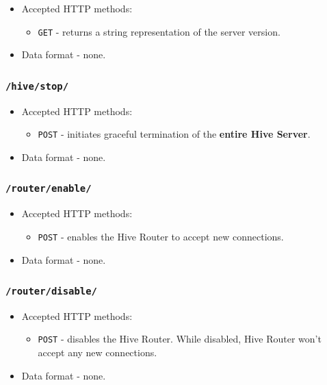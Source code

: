 \documentclass[a4paper]{article}
\begin{document}
\begin{itemize}
\item Accepted HTTP methods:
\begin{itemize}
\item \texttt{GET} - returns a string representation of the server version.
\end{itemize}
\item Data format - none.
\end{itemize}
\subsubsection{\texttt{/hive/stop/}}
\label{sec-6-1-2}
\label{ref-api_stop}


\begin{itemize}
\item Accepted HTTP methods:
\begin{itemize}
\item \texttt{POST} - initiates graceful termination of the \textbf{entire Hive Server}.
\end{itemize}
\item Data format - none.
\end{itemize}
\subsubsection{\texttt{/router/enable/}}
\label{sec-6-1-3}


\begin{itemize}
\item Accepted HTTP methods:
\begin{itemize}
\item \texttt{POST} - enables the Hive Router to accept new connections.
\end{itemize}
\item Data format - none.
\end{itemize}
\subsubsection{\texttt{/router/disable/}}
\label{sec-6-1-4}


\begin{itemize}
\item Accepted HTTP methods:
\begin{itemize}
\item \texttt{POST} - disables the Hive Router. While disabled, Hive Router won't accept any new connections.
\end{itemize}
\item Data format - none.
\end{itemize}
\end{document}

